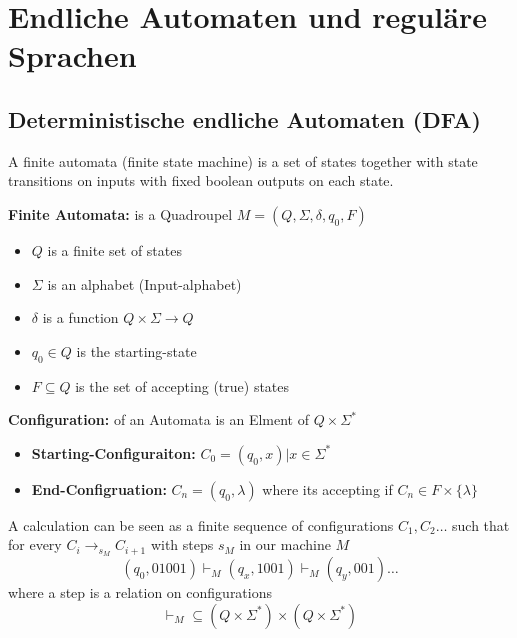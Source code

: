 \section{Endliche Automaten und reguläre Sprachen}

\subsection{Deterministische endliche Automaten (DFA)}

\begin{remark}
    A finite automata (finite state machine) is a set of states together with
    state transitions on inputs with fixed boolean outputs on each state.
\end{remark}

\begin{definition}
    \textbf{Finite Automata:} is a Quadroupel $M = (Q,\Sigma, \delta, q_0, F)$
    \begin{itemize}
        \item $Q$ is a finite set of states
        \item $\Sigma$ is an alphabet (Input-alphabet)
        \item $\delta$ is a function $Q \times \Sigma \to Q$
        \item $q_0 \in Q$ is the starting-state
        \item $F \subseteq Q$ is the set of accepting (true) states
    \end{itemize}
\end{definition}

\begin{definition}
    \textbf{Configuration:} of an Automata is an Elment of $Q \times \Sigma^*$
    \begin{itemize}
        \item \textbf{Starting-Configuraiton:} $C_0 = (q_0, x) | x \in \Sigma^*$
        \item \textbf{End-Configruation:} $C_n = (q_0, \lambda)$ where its
              accepting if $C_n \in F \times \{\lambda\}$
    \end{itemize}
\end{definition}

\begin{remark}
    A calculation can be seen as a finite sequence of configurations
    $C_1, C_2 \dots$ such that for every $C_i \to_{s_M} C_{i+1}$ with steps
    $s_M$ in our machine $M$
    $$
        (q_0, 01001) \vdash_{M} (q_x, 1001) \vdash_{M} (q_y, 001) \dots
    $$
    where a step is a relation on configurations
    $$
        \vdash_{M} \subseteq (Q \times \Sigma^*) \times (Q \times \Sigma^*)
    $$
\end{remark}

